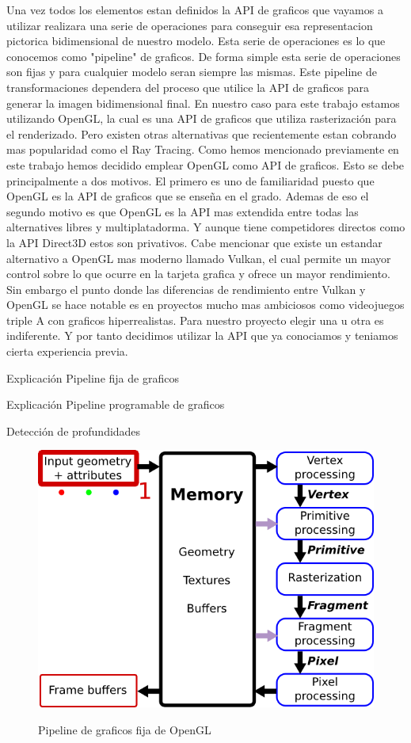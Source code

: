 Una vez todos los elementos estan definidos la API de graficos que vayamos a utilizar realizara una serie de operaciones para conseguir esa representacion pictorica bidimensional de nuestro modelo. Esta serie de operaciones es lo que conocemos como "pipeline" de graficos. De forma simple esta serie de operaciones son fijas y para cualquier modelo seran siempre las mismas. Este pipeline de transformaciones dependera del proceso que utilice la API de graficos para generar
la imagen bidimensional final. En  nuestro caso para este trabajo estamos utilizando OpenGL, la cual es una API de graficos que utiliza rasterización para el renderizado. Pero existen otras alternativas que recientemente estan cobrando mas popularidad como el Ray Tracing. Como hemos mencionado previamente en este trabajo hemos decidido emplear OpenGL como API de graficos. Esto se debe principalmente a dos motivos. El primero es uno de familiaridad puesto que OpenGL es la API de graficos
que se enseña en el grado. Ademas de eso el segundo motivo es que OpenGL es la API mas extendida entre todas las alternatives libres y multiplatadorma. Y aunque tiene competidores directos como la API Direct3D estos son privativos. Cabe mencionar que existe un estandar alternativo a OpenGL mas moderno llamado Vulkan, el cual permite un mayor control sobre lo que ocurre en la tarjeta grafica y ofrece un mayor rendimiento. Sin embargo el punto donde las diferencias de rendimiento entre Vulkan y OpenGL 
se hace notable es en proyectos mucho mas ambiciosos como videojuegos triple A con graficos hiperrealistas. Para nuestro proyecto elegir una u otra es indiferente. Y por tanto decidimos utilizar la API que ya conociamos y teniamos cierta experiencia previa.

Explicación Pipeline fija de graficos

Explicación Pipeline programable de graficos

Detección de profundidades

\begin{figure}
    \centering
    \includegraphics[width=\textwidth]{imagenes/Pipeline_Fija.png}
    \caption{Pipeline de graficos fija de OpenGL}
    \cite{freeSI03graphicsPipeline}
\end{figure}

